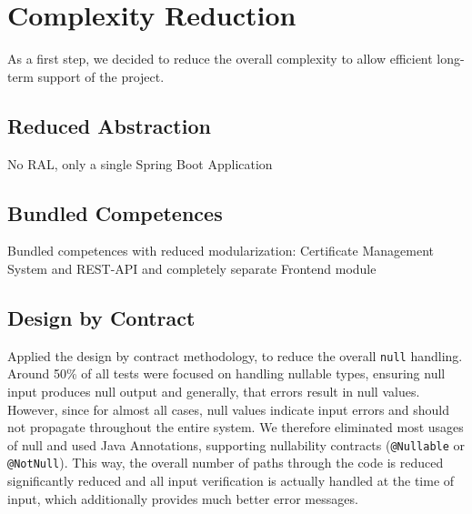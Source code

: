 \section{Complexity Reduction}\label{sec:complexityReduction}
As a first step, we decided to reduce the overall complexity to allow efficient long-term support of the project.
\subsection*{Reduced Abstraction}
No RAL, only a single Spring Boot Application

\subsection*{Bundled Competences}
Bundled competences with reduced modularization: Certificate Management System and REST-API and completely separate
Frontend module

\subsection*{Design by Contract}
Applied the design by contract\cite{meyer1992applying} methodology, to reduce the overall \lstinline{null} handling.
Around 50\% of all tests were focused on handling nullable types, ensuring null input produces null output and
generally, that errors result in null values.
However, since for almost all cases, null values indicate input errors and should not propagate throughout the entire
system.
We therefore eliminated most usages of null and used Java Annotations, supporting nullability contracts
(\lstinline{@Nullable} or \lstinline{@NotNull}).
This way, the overall number of paths through the code is reduced significantly reduced and all input verification is
actually handled at the time of input, which additionally provides much better error messages.

